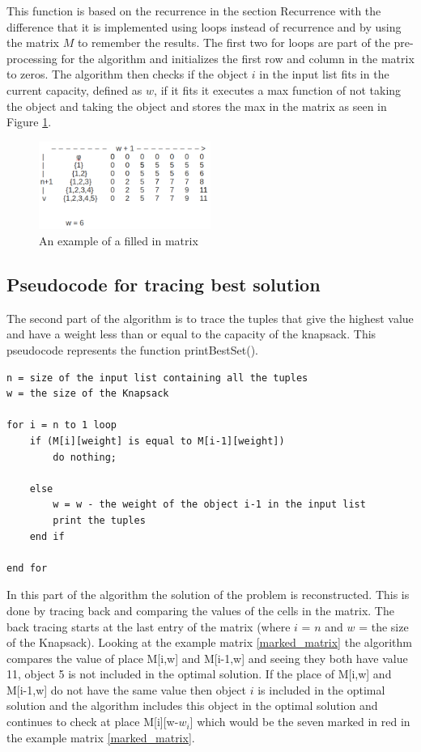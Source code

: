 \documentclass{inc/mas}
\begin{document}
This function is based on the recurrence in the section Recurrence with the difference that it is implemented using loops instead of recurrence and by using the matrix $M$ to remember the results. The first two for loops are part of the pre-processing for the algorithm and initializes the first row and column in the matrix to zeros. The algorithm then checks if the object $i$ in the input list fits in the current capacity, defined as $w$, if it fits it executes a max function of not taking the object and taking the object and stores the max in the matrix as seen in Figure \ref{unmarked_matrix}. 


{\color{red}{add which objects the matrix is for}}
\begin{figure}[h!]
  \centering
      \includegraphics[width=0.5\textwidth]{unmarked_matrix.png}
  \caption{An example of a filled in matrix}
\label{unmarked_matrix}
\end{figure}

\subsection{Pseudocode for tracing best solution}

The second part of the algorithm is to trace the tuples that give the highest value and have a weight less than or equal to the capacity of the knapsack. This pseudocode represents the function printBestSet(). \\ 

\begin{lstlisting}
n = size of the input list containing all the tuples
w = the size of the Knapsack 

for i = n to 1 loop
	if (M[i][weight] is equal to M[i-1][weight])
		do nothing;
	
	else
		w = w - the weight of the object i-1 in the input list
		print the tuples
	end if 
	
end for
\end{lstlisting}

In this part of the algorithm the solution of the problem is reconstructed. This is done by tracing back and comparing the values of the cells in the  matrix. The back tracing starts at the last entry of the matrix (where $i$ = $n$ and $w$ = the size of the Knapsack). Looking at the example matrix \ref{marked_matrix} the algorithm compares the value of place M[i,w] and M[i-1,w] and seeing they both have value 11, object 5 is not included in the optimal solution. If the place of M[i,w] and M[i-1,w] do not have the same value then object $i$ is included in the optimal solution and the algorithm includes this object in the optimal solution and continues to check at place M[i][w-$w_i$] which would be the seven marked in red in the example matrix \ref{marked_matrix}.\\
\end{document}

